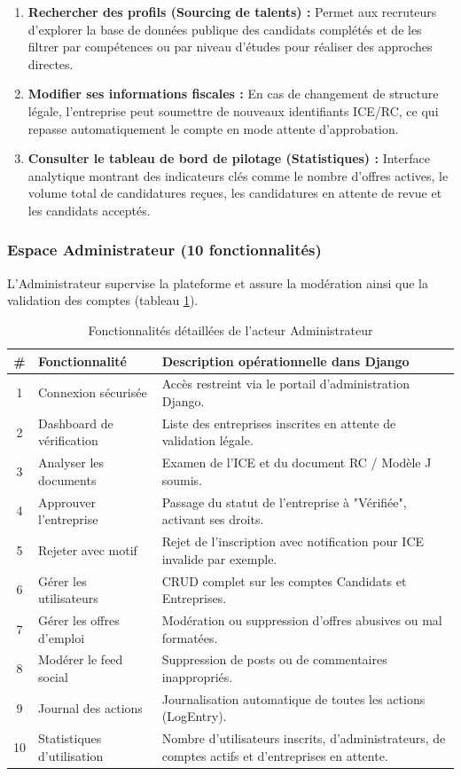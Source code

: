 \begin{enumerate}
    \item \textbf{Rechercher des profils (Sourcing de talents) :} Permet aux recruteurs d'explorer la base de données publique des candidats complétés et de les filtrer par compétences ou par niveau d'études pour réaliser des approches directes.
    \item \textbf{Modifier ses informations fiscales :} En cas de changement de structure légale, l'entreprise peut soumettre de nouveaux identifiants ICE/RC, ce qui repasse automatiquement le compte en mode attente d'approbation.
    \item \textbf{Consulter le tableau de bord de pilotage (Statistiques) :} Interface analytique montrant des indicateurs clés comme le nombre d'offres actives, le volume total de candidatures reçues, les candidatures en attente de revue et les candidats acceptés.
\end{enumerate}

\subsubsection{Espace Administrateur (10 fonctionnalités)}
L'Administrateur supervise la plateforme et assure la modération ainsi que la validation des comptes (tableau \ref{tab:features_admin}).

\begin{table}[H]
\centering
\small
\begin{tabularx}{\textwidth}{c >{\raggedright\arraybackslash}p{4cm} >{\raggedright\arraybackslash}X}
\toprule
\textbf{\#} & \textbf{Fonctionnalité} & \textbf{Description opérationnelle dans Django} \\
\midrule
1 & Connexion sécurisée & Accès restreint via le portail d'administration Django. \\
2 & Dashboard de vérification & Liste des entreprises inscrites en attente de validation légale. \\
3 & Analyser les documents & Examen de l'ICE et du document RC / Modèle J soumis. \\
4 & Approuver l'entreprise & Passage du statut de l'entreprise à "Vérifiée", activant ses droits. \\
5 & Rejeter avec motif & Rejet de l'inscription avec notification pour ICE invalide par exemple. \\
6 & Gérer les utilisateurs & CRUD complet sur les comptes Candidats et Entreprises. \\
7 & Gérer les offres d'emploi & Modération ou suppression d'offres abusives ou mal formatées. \\
8 & Modérer le feed social & Suppression de posts ou de commentaires inappropriés. \\
9 & Journal des actions & Journalisation automatique de toutes les actions (LogEntry). \\
10 & Statistiques d'utilisation & Nombre d'utilisateurs inscrits, d'administrateurs, de comptes actifs et d'entreprises en attente. \\
\bottomrule
\end{tabularx}
\caption{Fonctionnalités détaillées de l'acteur Administrateur}
\label{tab:features_admin}
\end{table}


